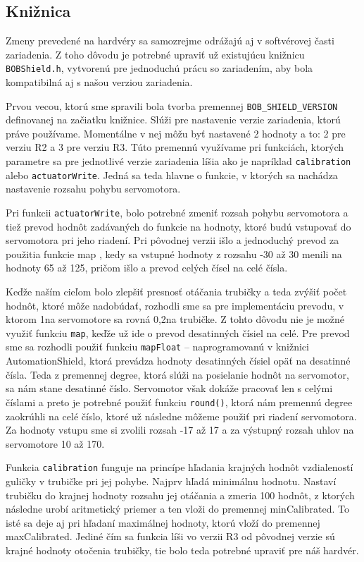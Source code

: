\subsection{Knižnica}
\label{kap:3.1.2}

Zmeny prevedené na hardvéry sa samozrejme odrážajú aj v softvérovej časti zariadenia. Z toho dôvodu je potrebné upraviť už existujúcu knižnicu \texttt{BOBShield.h}, vytvorenú pre jednoduchú prácu so zariadením, aby bola kompatibilná aj s našou verziou zariadenia. 

Prvou vecou, ktorú sme spravili bola tvorba premennej \texttt{BOB\_SHIELD\_VERSION} definovanej na začiatku knižnice. Slúži pre nastavenie verzie zariadenia, ktorú práve používame. Momentálne v nej môžu byť nastavené 2 hodnoty a to: 2 pre verziu R2 a 3 pre verziu R3. Túto premennú využívame pri funkciách, ktorých parametre sa pre jednotlivé verzie zariadenia líšia ako je napríklad \texttt{calibration} alebo \texttt{actuatorWrite}. Jedná sa teda hlavne o funkcie, v ktorých sa nachádza nastavenie rozsahu pohybu servomotora. 

Pri funkcii \texttt{actuatorWrite}, bolo potrebné zmeniť rozsah pohybu servomotora a tiež prevod hodnôt zadávaných do funkcie na hodnoty, ktoré budú vstupovať do servomotora pri jeho riadení. Pri pôvodnej verzii išlo a jednoduchý prevod za použitia funkcie map  , kedy sa vstupné hodnoty z rozsahu -30 až 30 menili na hodnoty 65 až 125, pričom išlo a prevod celých čísel na celé čísla. 

Keďže naším cieľom bolo zlepšiť presnosť otáčania trubičky a teda zvýšiť počet hodnôt, ktoré môže nadobúdať, rozhodli sme sa pre implementáciu prevodu, v ktorom 1\degree na servomotore sa rovná 0,2\degree na trubičke. Z tohto dôvodu nie je možné využiť funkciu \texttt{map}, keďže už ide o prevod desatinných čísiel na celé. Pre prevod sme sa rozhodli použiť funkciu \texttt{mapFloat} – naprogramovanú v knižnici AutomationShield, ktorá prevádza hodnoty desatinných čísiel opäť na desatinné čísla. Teda z premennej degree, ktorá slúži na posielanie hodnôt na servomotor, sa nám stane desatinné číslo. Servomotor však dokáže pracovať len s celými číslami a preto je potrebné použiť funkciu \texttt{round()}, ktorá nám premennú degree zaokrúhli na celé číslo, ktoré už následne môžeme použiť pri riadení servomotora. Za hodnoty vstupu sme si zvolili rozsah -17 až 17 a za výstupný rozsah uhlov na servomotore 10 až 170.  

Funkcia \texttt{calibration} funguje na princípe hľadania krajných hodnôt vzdialeností guličky v trubičke pri jej pohybe. Najprv hľadá minimálnu hodnotu. Nastaví trubičku do krajnej hodnoty rozsahu jej otáčania a zmeria 100 hodnôt, z ktorých následne urobí aritmetický priemer a ten vloži do premennej minCalibrated. To isté sa deje aj pri hľadaní maximálnej hodnoty, ktorú vloží do premennej maxCalibrated. Jediné čím sa funkcia líši vo verzii R3 od pôvodnej verzie sú krajné hodnoty otočenia trubičky, tie bolo teda potrebné upraviť pre náš hardvér.


